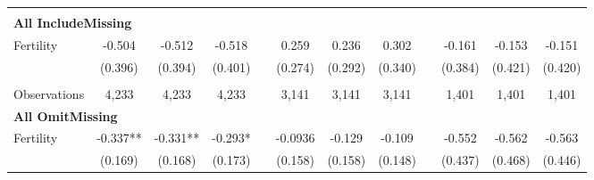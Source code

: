 \begin{landscape}
\begin{table}[htpb!]
\begin{center}
\begin{tabular}{lcccp{2mm}cccp{2mm}ccc}
\begin{footnotesize}\end{footnotesize}\\ 
\multicolumn{12}{l}{\textbf{All IncludeMissing}}\\ 
Fertility&-0.504&-0.512&-0.518&&0.259&0.236&0.302&&-0.161&-0.153&-0.151\\
&(0.396)&(0.394)&(0.401)&&(0.274)&(0.292)&(0.340)&&(0.384)&(0.421)&(0.420)\\
\begin{footnotesize}\end{footnotesize}&\begin{footnotesize}\end{footnotesize}&\begin{footnotesize}\end{footnotesize}&\begin{footnotesize}\end{footnotesize}&\begin{footnotesize}\end{footnotesize}&\begin{footnotesize}\end{footnotesize}&\begin{footnotesize}\end{footnotesize}&\begin{footnotesize}\end{footnotesize}&\begin{footnotesize}\end{footnotesize}&\begin{footnotesize}\end{footnotesize}&\begin{footnotesize}\end{footnotesize}&\begin{footnotesize}\end{footnotesize}\\Observations&4,233&4,233&4,233&&3,141&3,141&3,141&&1,401&1,401&1,401\\
\multicolumn{12}{l}{\textbf{All OmitMissing}}\\ 
Fertility&-0.337**&-0.331**&-0.293*&&-0.0936&-0.129&-0.109&&-0.552&-0.562&-0.563\\
&(0.169)&(0.168)&(0.173)&&(0.158)&(0.158)&(0.148)&&(0.437)&(0.468)&(0.446)\\

\end{tabular}
\end{center}
\end{table}
\end{landscape}
